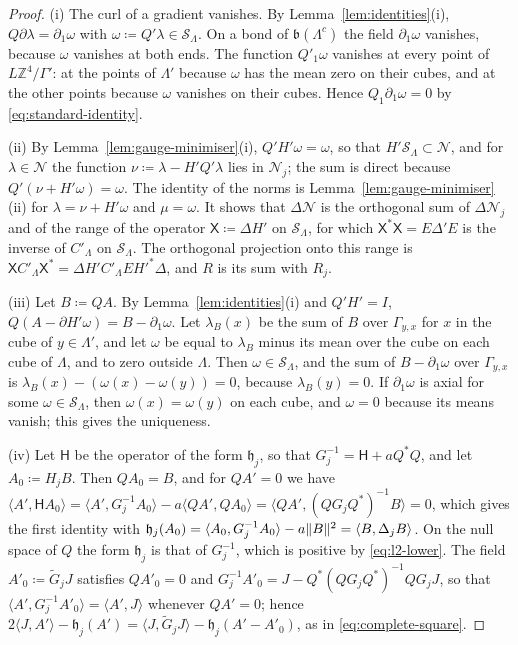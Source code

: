 \documentclass[11pt]{preprint}
\DeclarePairedDelimiter{\norm}{\lVert}{\rVert}
\numberwithin{equation}{section}
\theoremstyle{definition}
\theoremstyle{remark}
\theoremstyle{plain}
\begin{document}
\begin{proof}
(i) The curl of a gradient vanishes. By Lemma~\ref{lem:identities}(i), $Q\partial\lambda = \partial_1\omega$ with $\omega \coloneqq Q'\lambda \in \mathcal S_\Lambda$. On a bond of $\mathfrak b(\Lambda^c)$ the field $\partial_1\omega$ vanishes, because $\omega$ vanishes at both ends. The function $Q'_1\omega$ vanishes at every point of $L\mathbb Z^4/\Gamma'$: at the points of $\Lambda'$ because $\omega$ has the mean zero on their cubes, and at the other points because $\omega$ vanishes on their cubes. Hence $Q_1\partial_1\omega = 0$ by \eqref{eq:standard-identity}.

(ii) By Lemma~\ref{lem:gauge-minimiser}(i), $Q'H'\omega = \omega$, so that $H'\mathcal S_\Lambda \subset \mathcal N$, and for $\lambda \in \mathcal N$ the function $\nu \coloneqq \lambda - H'Q'\lambda$ lies in $\mathcal N_j$; the sum is direct because $Q'(\nu + H'\omega) = \omega$. The identity of the norms is Lemma~\ref{lem:gauge-minimiser}(ii) for $\lambda = \nu + H'\omega$ and $\mu = \omega$. It shows that $\Delta\mathcal N$ is the orthogonal sum of $\Delta\mathcal N_j$ and of the range of the operator $\mathsf X \coloneqq \Delta H'$ on $\mathcal S_\Lambda$, for which $\mathsf X^*\mathsf X = E\Delta'E$ is the inverse of $C'_\Lambda$ on $\mathcal S_\Lambda$. The orthogonal projection onto this range is $\mathsf XC'_\Lambda\mathsf X^* = \Delta H'C'_\Lambda EH'^*\Delta$, and $R$ is its sum with $R_j$.

(iii) Let $B \coloneqq QA$. By Lemma~\ref{lem:identities}(i) and $Q'H' = I$, $Q(A - \partial H'\omega) = B - \partial_1\omega$. Let $\lambda_B(x)$ be the sum of $B$ over $\Gamma_{y,x}$ for $x$ in the cube of $y \in \Lambda'$, and let $\omega$ be equal to $\lambda_B$ minus its mean over the cube on each cube of $\Lambda$, and to zero outside $\Lambda$. Then $\omega \in \mathcal S_\Lambda$, and the sum of $B - \partial_1\omega$ over $\Gamma_{y,x}$ is $\lambda_B(x) - (\omega(x) - \omega(y)) = 0$, because $\lambda_B(y) = 0$. If $\partial_1\omega$ is axial for some $\omega \in \mathcal S_\Lambda$, then $\omega(x) = \omega(y)$ on each cube, and $\omega = 0$ because its means vanish; this gives the uniqueness.

(iv) Let $\mathsf H$ be the operator of the form $\mathfrak h_j$, so that $G_j^{-1} = \mathsf H + aQ^*Q$, and let $A_0 \coloneqq H_jB$. Then $QA_0 = B$, and for $QA' = 0$ we have $\langle A', \mathsf HA_0\rangle = \langle A', G_j^{-1}A_0\rangle - a\langle QA', QA_0\rangle = \langle QA', (QG_jQ^*)^{-1}B\rangle = 0$, which gives the first identity with $\mathfrak h_j(A_0) = \langle A_0, G_j^{-1}A_0\rangle - a\norm B^2 = \langle B, \Delta_jB\rangle$. On the null space of $Q$ the form $\mathfrak h_j$ is that of $G_j^{-1}$, which is positive by \eqref{eq:l2-lower}. The field $A'_0 \coloneqq \tilde G_jJ$ satisfies $QA'_0 = 0$ and $G_j^{-1}A'_0 = J - Q^*(QG_jQ^*)^{-1}QG_jJ$, so that $\langle A', G_j^{-1}A'_0\rangle = \langle A', J\rangle$ whenever $QA' = 0$; hence $2\langle J, A'\rangle - \mathfrak h_j(A') = \langle J, \tilde G_jJ\rangle - \mathfrak h_j(A' - A'_0)$, as in \eqref{eq:complete-square}.


\end{proof}
\end{document}
